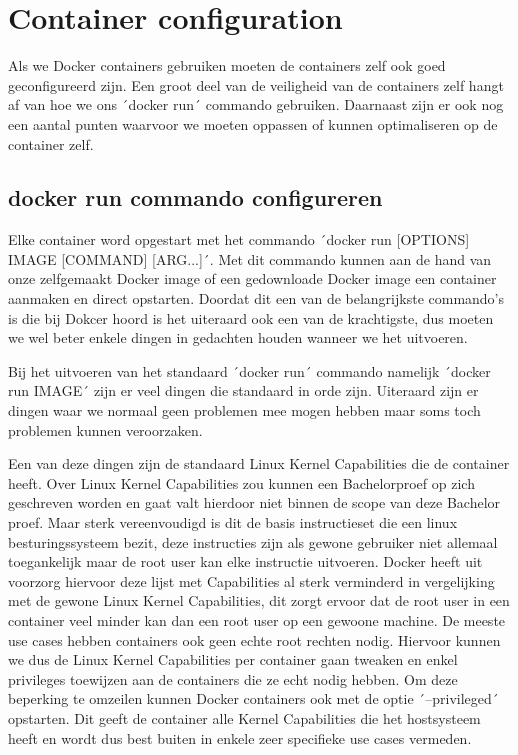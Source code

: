 \section{Container configuration}

Als we Docker containers gebruiken moeten de containers zelf ook goed geconfigureerd zijn. Een groot deel van de veiligheid van de containers zelf hangt af van hoe we ons ´docker run´ commando gebruiken. Daarnaast zijn er ook nog een aantal punten waarvoor we moeten oppassen of kunnen optimaliseren op de container zelf.

\subsection{docker run commando configureren}

Elke container word opgestart met het commando ´docker run [OPTIONS] IMAGE [COMMAND] [ARG...]´. Met dit commando kunnen aan de hand van onze zelfgemaakt Docker image of een gedownloade Docker image een container aanmaken en direct opstarten. Doordat dit een van de belangrijkste commando's is die bij Dokcer hoord is het uiteraard ook een van de krachtigste, dus moeten we wel beter enkele dingen in gedachten houden wanneer we het uitvoeren.

Bij het uitvoeren van het standaard ´docker run´ commando namelijk ´docker run IMAGE´ zijn er veel dingen die standaard in orde zijn. Uiteraard zijn er dingen waar we normaal geen problemen mee mogen hebben maar soms toch problemen kunnen veroorzaken.

Een van deze dingen zijn de standaard Linux Kernel Capabilities die de container heeft. Over Linux Kernel Capabilities zou kunnen een Bachelorproef op zich geschreven worden en gaat valt hierdoor niet binnen de scope van deze Bachelor proef. Maar sterk vereenvoudigd is dit de basis instructieset die een linux besturingssysteem bezit, deze instructies zijn als gewone gebruiker niet allemaal toegankelijk maar de root user kan elke instructie uitvoeren. Docker heeft uit voorzorg hiervoor deze lijst met Capabilities al sterk verminderd in vergelijking met de gewone Linux Kernel Capabilities, dit zorgt ervoor dat de root user in een container veel minder kan dan een root user op een gewoone machine. De meeste use cases hebben containers ook geen echte root rechten nodig. Hiervoor kunnen we dus de Linux Kernel Capabilities per container gaan tweaken en enkel privileges toewijzen aan de containers die ze echt nodig hebben. Om deze beperking te omzeilen kunnen Docker containers ook met de optie ´--privileged´ opstarten. Dit geeft de container alle Kernel Capabilities die het hostsysteem heeft en wordt dus best buiten in enkele zeer specifieke use cases vermeden.

